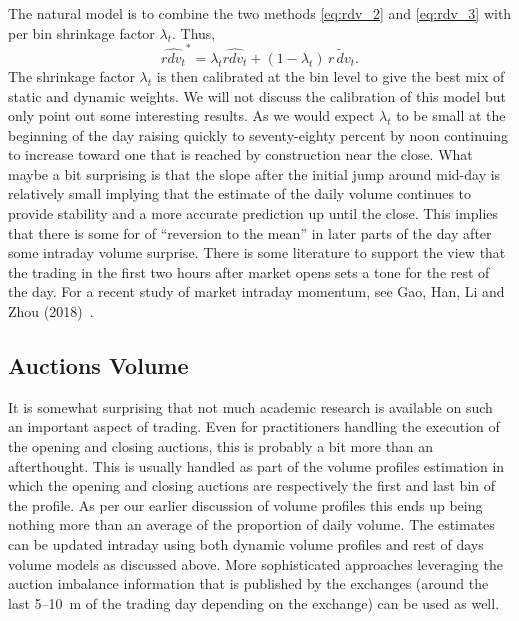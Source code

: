 The natural  model is to combine the two methods \eqref{eq:rdv_2} and \eqref{eq:rdv_3} with per bin shrinkage factor $\lambda_t$. Thus,
	\begin{equation}\label{eq:rdv_4}
	\widehat{rdv_t}^* = \lambda_t \widehat{rdv_t} + (1-\lambda_t)\, \widetilde{r\, dv_t}.
	\end{equation}
The shrinkage factor $\lambda_t$ is then calibrated at the bin level to give the best mix of static and dynamic weights. We will not discuss the calibration of this model but only point out some interesting results. As we would expect $\lambda_t$ to be small at the beginning of the day raising quickly to seventy-eighty percent by noon continuing to increase toward one that is reached by construction near the close. What maybe a bit surprising is that the slope after the initial jump around mid-day is relatively small implying that the estimate of the daily volume continues to provide stability and a more accurate prediction up until the close. This implies that there is some for of ``reversion to the mean'' in later parts of the day after some intraday volume surprise. There is some literature to support the view that the trading in the first two hours after market opens sets a tone for the rest of the day. For a recent study of market intraday momentum, see Gao, Han, Li and Zhou (2018)~\cite{ghliz}.



\subsection{Auctions Volume}

It is somewhat surprising that not much academic research is available on such an important aspect of trading. Even for practitioners handling the execution of the opening and closing auctions, this is probably a bit more than an afterthought. This is usually handled as part of the volume profiles estimation in which the opening and closing auctions are respectively the first and last bin of the profile. As per our earlier discussion of volume profiles this ends up being nothing more than an average of the proportion of daily volume. The estimates can be updated  intraday using both dynamic volume profiles and rest of days volume models as discussed above. More sophisticated approaches leveraging the auction imbalance information that is published by the exchanges (around the last 5--10~m of the trading day depending on the exchange) can be used as well.


